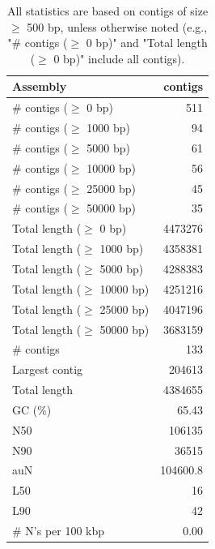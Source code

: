 \documentclass[12pt,a4paper]{article}
\begin{document}
\begin{table}[ht]
\begin{center}
\caption{All statistics are based on contigs of size $\geq$ 500 bp, unless otherwise noted (e.g., "\# contigs ($\geq$ 0 bp)" and "Total length ($\geq$ 0 bp)" include all contigs).}
\begin{tabular}{|l*{1}{|r}|}
\hline
Assembly & contigs \\ \hline
\# contigs ($\geq$ 0 bp) & 511 \\ \hline
\# contigs ($\geq$ 1000 bp) & 94 \\ \hline
\# contigs ($\geq$ 5000 bp) & 61 \\ \hline
\# contigs ($\geq$ 10000 bp) & 56 \\ \hline
\# contigs ($\geq$ 25000 bp) & 45 \\ \hline
\# contigs ($\geq$ 50000 bp) & 35 \\ \hline
Total length ($\geq$ 0 bp) & 4473276 \\ \hline
Total length ($\geq$ 1000 bp) & 4358381 \\ \hline
Total length ($\geq$ 5000 bp) & 4288383 \\ \hline
Total length ($\geq$ 10000 bp) & 4251216 \\ \hline
Total length ($\geq$ 25000 bp) & 4047196 \\ \hline
Total length ($\geq$ 50000 bp) & 3683159 \\ \hline
\# contigs & 133 \\ \hline
Largest contig & 204613 \\ \hline
Total length & 4384655 \\ \hline
GC (\%) & 65.43 \\ \hline
N50 & 106135 \\ \hline
N90 & 36515 \\ \hline
auN & 104600.8 \\ \hline
L50 & 16 \\ \hline
L90 & 42 \\ \hline
\# N's per 100 kbp & 0.00 \\ \hline
\end{tabular}
\end{center}
\end{table}
\end{document}
